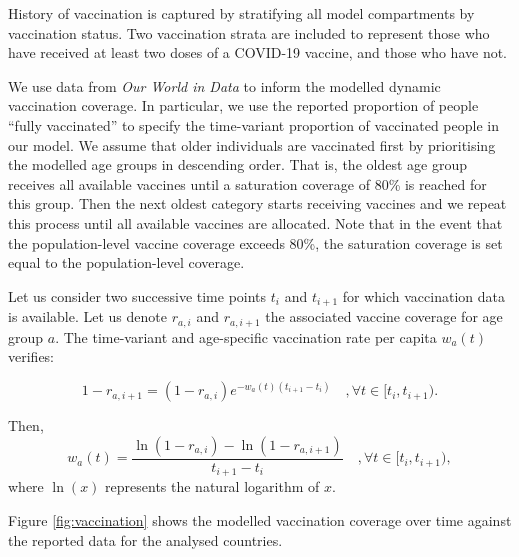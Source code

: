 
History of vaccination is captured by stratifying all model compartments by vaccination status.
Two vaccination strata are included to represent those who have received at least two doses of a COVID-19 vaccine,
and those who have not.

We use data from \textit{Our World in Data} to inform the modelled dynamic vaccination coverage. In particular, we use the reported proportion of 
people ``fully vaccinated'' to specify the time-variant proportion of vaccinated people in our model. We assume that older individuals are vaccinated 
first by prioritising the modelled age groups in descending order. That is, the oldest age group receives all available vaccines until a 
saturation coverage of 80\% is reached for this group. Then the next oldest category starts receiving vaccines and we repeat this process until all available vaccines
are allocated. Note that in the event that the population-level vaccine coverage exceeds 80\%, the saturation coverage is set equal to the population-level coverage. 

Let us consider two successive time points $t_i$ and $t_{i+1}$ for which vaccination data is available. Let us denote $r_{a, i}$ and $r_{a, i+1}$ the associated vaccine 
coverage for age group $a$. The time-variant and age-specific vaccination rate per capita $w_a(t)$ verifies:

\begin{equation}
    1 - r_{a, i+1} = (1 - r_{a, i})e^{-w_a(t)(t_{i+1} - t_i)} \quad, \forall t \in [t_i, t_{i+1}) .
\end{equation}

Then, 
\begin{equation}
    \label{eq:vacc}
    w_a(t) = \frac{\ln(1 - r_{a, i}) - \ln(1 - r_{a, i+1})}{t_{i+1} - t_i} \quad, \forall t \in [t_i, t_{i+1}) ,
\end{equation}
where $\ln(x)$ represents the natural logarithm of $x$.

Figure \ref{fig:vaccination} shows the modelled vaccination coverage over time against the reported data for the analysed countries.

